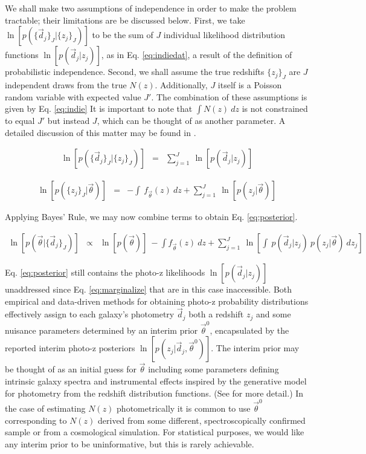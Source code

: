 \documentclass[preprint]{aastex}
\begin{document}
We shall make two assumptions of independence in order to make the problem 
tractable; their limitations are be discussed below.  First, we take 
$\ln[p(\{\vec{d}_{j}\}_{J}|\{z_{j}\}_{J})]$ to be the sum of $J$ individual 
likelihood distribution functions $\ln[p(\vec{d}_{j}|z_{j})]$, as in Eq. 
\ref{eq:indiedat}, a result of the definition of probabilistic independence.  
Second, we shall assume the true redshifts $\{z_{j}\}_{J}$ are $J$ independent 
draws from the true $N(z)$.  Additionally, $J$ itself is a Poisson random 
variable with expected value $J'$.  The combination of these assumptions is 
given by Eq. \ref{eq:indie}  It is important to note that $\int N(z)\ dz$ is 
not constrained to equal $J'$ but instead $J$, which can be thought of as 
another parameter.  A detailed discussion of this matter may be found in 
\citet{Foreman-Mackey2014}.

\begin{eqnarray}
\label{eq:indiedat}
\ln[p(\{\vec{d}_{j}\}_{J}|\{z_{j}\}_{J})] &=& \sum_{j=1}^{J}\ 
\ln[p(\vec{d}_{j}|z_{j})]
\end{eqnarray}

\begin{eqnarray}
\label{eq:indie}
\ln[p(\{z_{j}\}_{J}|\vec{\theta})] &=& -\int\ f_{\vec{\theta}}(z)\ dz +  
\sum_{j=1}^{J}\ \ln[p(z_{j}|\vec{\theta})]
\end{eqnarray}

Applying Bayes' Rule, we may now combine terms to obtain Eq. 
\ref{eq:posterior}.  

\begin{eqnarray}
\label{eq:posterior}
\ln[p(\vec{\theta}|\{\vec{d}_{j}\}_{J})] &\propto& \ln[p(\vec{\theta})]\ -\int 
f_{\vec{\theta}}(z)\ dz + \sum_{j=1}^{J}\ \ln\left[\int\ p(\vec{d}_{j}|z_{j})\ 
p(z_{j}|\vec{\theta})\ dz_{j}\right]
\end{eqnarray}

Eq. \ref{eq:posterior} still contains the photo-z likelihoods 
$\ln[p(\vec{d}_{j}|z_{j})]$ unaddressed since Eq. \ref{eq:marginalize} that are 
in this case inaccessible.  Both empirical and data-driven methods for 
obtaining photo-z probability distributions effectively assign to each galaxy's 
photometry $\vec{d}_{j}$ both a redshift $z_{j}$ and some nuisance parameters 
determined by an interim prior $\vec{\theta}^{0}$, encapsulated by the reported 
interim photo-z posteriors $\ln[p(z_{j}|\vec{d}_{j},\vec{\theta}^{0})]$.  The 
interim prior may be thought of as an initial guess for $\vec{\theta}$ 
including some parameters defining intrinsic galaxy spectra and instrumental 
effects inspired by the generative model for photometry from the redshift 
distribution functions. (See \citet{Benitez2000} for more detail.)  In the case 
of estimating $N(z)$ photometrically it is common to use $\vec{\theta}^{0}$ 
corresponding to $N(z)$ derived from some different, spectroscopically 
confirmed sample or from a cosmological simulation.  For statistical purposes, 
we would like any interim prior to be uninformative, but this is rarely 
achievable.  
\end{document}
